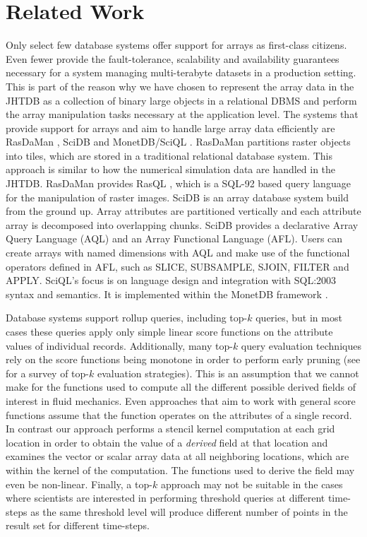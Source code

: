 \documentclass{sig-alternate}
\begin{document}
\section{Related Work}
Only select few database systems offer support for arrays as first-class citizens. Even fewer provide the fault-tolerance, scalability and availability guarantees 
necessary for a system managing multi-terabyte datasets in a production setting. This is part of the reason why we have chosen to represent the array
data in the JHTDB as a collection of binary large objects in a relational DBMS and perform the array manipulation tasks necessary at the application level.
The systems that provide
support for arrays and aim to handle large array data efficiently are RasDaMan \cite{Rasdaman}, SciDB \cite{Scidb} and MonetDB/SciQL \cite{Sciql}. RasDaMan
partitions raster objects into tiles, which are stored in a traditional relational database system. This approach is similar to how the numerical simulation data
are handled in the JHTDB. RasDaMan provides RasQL \cite{Rasql}, which is a SQL-92 based query language for the manipulation of raster images. SciDB
is an array database system build from the ground up. Array attributes are partitioned vertically and each attribute array is decomposed into overlapping
chunks. SciDB provides a declarative Array Query Language (AQL) and an Array Functional Language (AFL). Users can create arrays with named
dimensions with AQL and make use of the functional operators defined in AFL, such
as SLICE, SUBSAMPLE, SJOIN, FILTER and APPLY. SciQL's focus is on language design and integration with SQL:2003 syntax and semantics. It is implemented
within the MonetDB framework \cite{MonetDB}.

Database systems support rollup queries, including top-$k$ queries, but in most cases these
queries apply only simple linear score functions on the attribute values of individual records.
Additionally, many top-$k$ query evaluation techniques rely on the score functions being monotone in order to perform early pruning (see \cite{Ilyas} for a
survey of top-$k$ evaluation strategies).
This is an assumption that we cannot make for the functions used to compute all the different possible derived fields of interest in fluid mechanics.
Even approaches that aim to work with general score functions \cite{Deshpande, Xin} assume that the function operates on the attributes of a single record.
In contrast our approach performs a stencil kernel computation at each grid location in order to obtain the value of a \emph{derived} field at that location and
examines the vector or scalar array data at all neighboring locations, which
are within the kernel of the computation. The functions used to derive the field may even be non-linear.
Finally, a top-$k$ approach may not be suitable in the cases where scientists are interested in performing threshold queries at different time-steps as the
same threshold level will produce different number of points in the result set for different time-steps.
\end{document}
